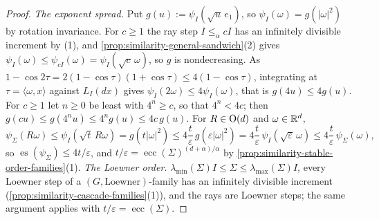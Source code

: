 \begin{proof}
\emph{The exponent spread.} Put $g(u) := \psi_I(\sqrt u\,e_1)$, so $\psi_I(\omega) = g(|\omega|^2)$ by rotation
invariance. For $c \ge 1$ the ray step $I \le_\alpha cI$ has an infinitely divisible increment by (1), and
\ref{prop:similarity-general-sandwich}(2) gives $\psi_I(\omega) \le \psi_{cI}(\omega) = \psi_I(\sqrt c\,\omega)$,
so $g$ is nondecreasing. As $1 - \cos 2\tau = 2(1 - \cos\tau)(1 + \cos\tau) \le 4(1 - \cos\tau)$,
integrating at $\tau = \langle \omega,x\rangle$ against $L_I(dx)$ gives $\psi_I(2\omega) \le 4\psi_I(\omega)$, that is
$g(4u) \le 4g(u)$. For $c \ge 1$ let $n \ge 0$ be least with $4^n \ge c$,
so that $4^n < 4c$; then $g(cu) \le g(4^nu) \le 4^ng(u) \le 4c\,g(u)$. For $R \in \mathrm{O}(d)$ and
$\omega \in \mathbb{R}^d$,
\[
  \psi_\Sigma(R\omega) \le \psi_I(\sqrt t\,R\omega) = g(t|\omega|^2) \le 4\frac{t}{\varepsilon}\,g(\varepsilon|\omega|^2)
  = 4\frac{t}{\varepsilon}\,\psi_I(\sqrt\varepsilon\,\omega) \le 4\frac{t}{\varepsilon}\,\psi_\Sigma(\omega) ,
\]
so $\operatorname{es}(\psi_\Sigma) \le 4t/\varepsilon$, and $t/\varepsilon = \operatorname{ecc}(\Sigma)^{(d+\alpha)/\alpha}$ by \ref{prop:similarity-stable-order-families}(1). \emph{The Loewner order.} $\lambda_{\min}(\Sigma)I \le \Sigma \le \lambda_{\max}(\Sigma)I$, every
Loewner step of a $(G, \text{Loewner})$-family has an infinitely divisible increment
(\ref{prop:similarity-cascade-families}(1)), and the rays are Loewner steps; the same argument applies with
$t/\varepsilon = \operatorname{ecc}(\Sigma)$.


\end{proof}
